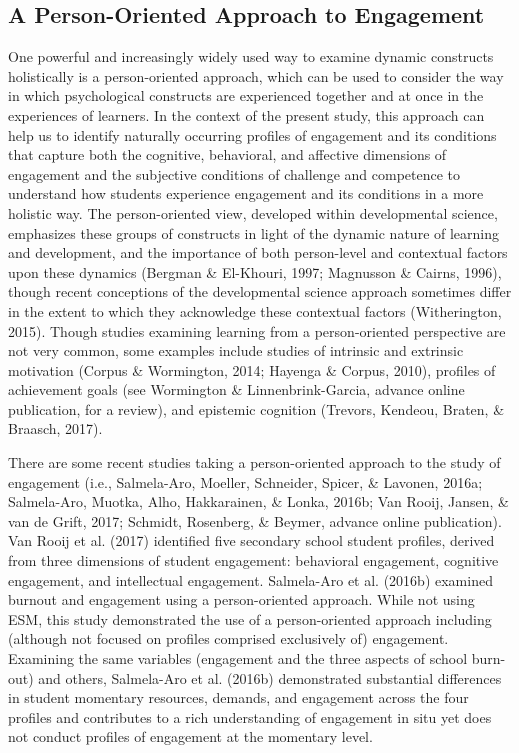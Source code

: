 \documentclass[]{msu-thesis}
\theoremstyle{definition}
\theoremstyle{definition}
\theoremstyle{definition}
\theoremstyle{remark}
\begin{document}
\subsection{A Person-Oriented Approach to
Engagement}\label{a-person-oriented-approach-to-engagement}

One powerful and increasingly widely used way to examine dynamic
constructs holistically is a person-oriented approach, which can be used
to consider the way in which psychological constructs are experienced
together and at once in the experiences of learners. In the context of
the present study, this approach can help us to identify naturally
occurring profiles of engagement and its conditions that capture both
the cognitive, behavioral, and affective dimensions of engagement and
the subjective conditions of challenge and competence to understand how
students experience engagement and its conditions in a more holistic
way. The person-oriented view, developed within developmental science,
emphasizes these groups of constructs in light of the dynamic nature of
learning and development, and the importance of both person-level and
contextual factors upon these dynamics (Bergman \& El-Khouri, 1997;
Magnusson \& Cairns, 1996), though recent conceptions of the
developmental science approach sometimes differ in the extent to which
they acknowledge these contextual factors (Witherington, 2015). Though
studies examining learning from a person-oriented perspective are not
very common, some examples include studies of intrinsic and extrinsic
motivation (Corpus \& Wormington, 2014; Hayenga \& Corpus, 2010),
profiles of achievement goals (see Wormington \& Linnenbrink-Garcia,
advance online publication, for a review), and epistemic cognition
(Trevors, Kendeou, Braten, \& Braasch, 2017).

There are some recent studies taking a person-oriented approach to the
study of engagement (i.e., Salmela-Aro, Moeller, Schneider, Spicer, \&
Lavonen, 2016a; Salmela-Aro, Muotka, Alho, Hakkarainen, \& Lonka, 2016b;
Van Rooij, Jansen, \& van de Grift, 2017; Schmidt, Rosenberg, \& Beymer,
advance online publication). Van Rooij et al. (2017) identified five
secondary school student profiles, derived from three dimensions of
student engagement: behavioral engagement, cognitive engagement, and
intellectual engagement. Salmela-Aro et al. (2016b) examined burnout and
engagement using a person-oriented approach. While not using ESM, this
study demonstrated the use of a person-oriented approach including
(although not focused on profiles comprised exclusively of) engagement.
Examining the same variables (engagement and the three aspects of school
burn-out) and others, Salmela-Aro et al. (2016b) demonstrated
substantial differences in student momentary resources, demands, and
engagement across the four profiles and contributes to a rich
understanding of engagement in situ yet does not conduct profiles of
engagement at the momentary level.
\end{document}
